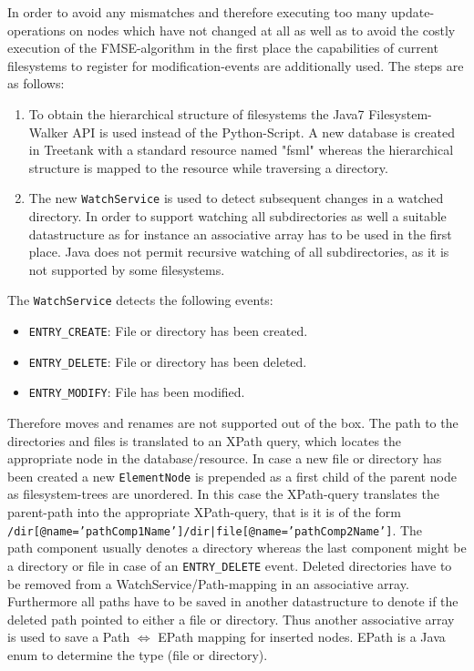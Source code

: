 In order to avoid any mismatches and therefore executing too many update-operations on nodes which have not changed at all as well as to avoid the costly execution of the FMSE-algorithm in the first place the capabilities of current filesystems to register for modification-events are additionally used. The steps are as follows:

\begin{enumerate}
\item To obtain the hierarchical structure of filesystems the Java7 Filesystem-Walker API is used instead of the Python-Script. A new database is created in Treetank with a standard resource named "fsml" whereas the hierarchical structure is mapped to the resource while traversing a directory. 
\item The new \texttt{WatchService} is used to detect subsequent changes in a watched directory. In order to support watching all subdirectories as well a suitable datastructure as for instance an associative array has to be used in the first place. Java does not permit recursive watching of all subdirectories, as it is not supported by some filesystems.
\end{enumerate}

The \texttt{WatchService} detects the following events:

\begin{itemize}
\item \texttt{ENTRY\_CREATE}: File or directory has been created.
\item \texttt{ENTRY\_DELETE}: File or directory has been deleted.
\item \texttt{ENTRY\_MODIFY}: File has been modified.
\end{itemize}

Therefore moves and renames are not supported out of the box. The path to the directories and files is translated to an XPath query, which locates the appropriate node in the database/resource. In case a new file or directory has been created a new \texttt{ElementNode} is pre\-pen\-ded as a first child of the parent node as filesystem-trees are unordered. In this case the XPath-query translates the parent-path into the appropriate XPath-query, that is it is of the form \\\texttt{/dir[@name='pathComp1Name']/dir|file[@name='pathComp2Name']}. The \\path component usually denotes a directory whereas the last component might be a directory or file in case of an \texttt{ENTRY\_DELETE} event. Deleted directories have to be removed from a WatchService/Path-mapping in an associative array. Furthermore all paths have to be saved in another datastructure to denote if the deleted path pointed to either a file or directory. Thus another associative array is used to save a Path $\Leftrightarrow$ EPath mapping for inserted nodes. EPath is a Java enum to determine the type (file or directory).

